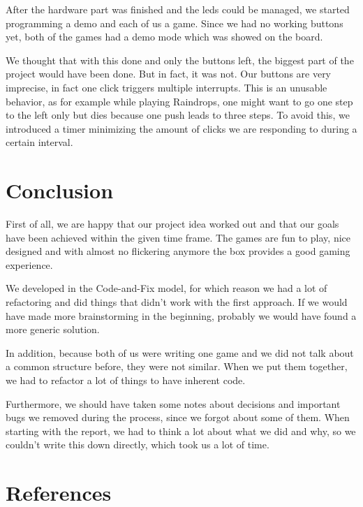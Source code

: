 \documentclass[a4paper,12pt]{article}
\begin{document}
After the hardware part was finished and the leds could be managed, we started programming a demo and each of us a game.
 Since we had no working buttons yet, both of the games had a demo mode which was showed on the board.

We thought that with this done and only the buttons left, the biggest part of the project would have been done.
 But in fact, it was not.
 Our buttons are very imprecise, in fact one click triggers multiple interrupts.
 This is an unusable behavior, as for example while playing Raindrops, one might want to go one step to the left only but dies because one push leads to three steps.
 To avoid this, we introduced a timer minimizing the amount of clicks we are responding to during a certain interval.

\section{Conclusion}
First of all, we are happy that our project idea worked out and that our goals have been achieved within the given time frame.
 The games are fun to play, nice designed and with almost no flickering anymore the box provides a good gaming experience.

We developed in the Code-and-Fix model, for which reason we had a lot of refactoring and did things that didn't work with the first approach.
 If we would have made more brainstorming in the beginning, probably we would have found a more generic solution.
 
 In addition, because both of us were writing one game and we did not talk about a common structure before, they were not similar.
 When we put them together, we had to refactor a lot of things to have inherent code.

Furthermore, we should have taken some notes about decisions and important bugs we removed during the process, since we forgot about some of them.
 When starting with the report, we had to think a lot about what we did and why, so we couldn't write this down directly, which took us a lot of time.

\section{References}
\end{document}
